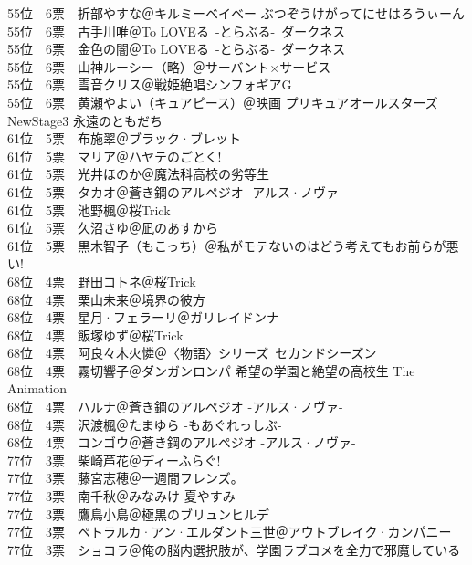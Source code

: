 {    55位　6票　折部やすな＠キルミーベイベー ぶつぞうけがってにせはろうぃーん\\
    55位　6票　古手川唯＠To LOVEる~-とらぶる-~ダークネス\\
    55位　6票　金色の闇＠To LOVEる~-とらぶる-~ダークネス\\
    55位　6票　山神ルーシー（略）＠サーバント×サービス\\
    55位　6票　雪音クリス＠戦姫絶唱シンフォギアG\\
    55位　6票　黄瀬やよい（キュアピース）＠映画 プリキュアオールスターズNewStage3 永遠のともだち\\
    61位　5票　布施翠＠ブラック·ブレット\\
    61位　5票　マリア＠ハヤテのごとく!\\
    61位　5票　光井ほのか＠魔法科高校の劣等生\\
    61位　5票　タカオ＠蒼き鋼のアルペジオ -アルス·ノヴァ-\\
    61位　5票　池野楓＠桜Trick\\
    61位　5票　久沼さゆ＠凪のあすから\\
    61位　5票　黒木智子（もこっち）＠私がモテないのはどう考えてもお前らが悪い!\\
    68位　4票　野田コトネ＠桜Trick\\
    68位　4票　栗山未来＠境界の彼方\\
    68位　4票　星月·フェラーリ＠ガリレイドンナ\\
    68位　4票　飯塚ゆず＠桜Trick\\
    68位　4票　阿良々木火憐＠〈物語〉シリーズ~セカンドシーズン\\
    68位　4票　霧切響子＠ダンガンロンパ 希望の学園と絶望の高校生 The Animation\\
    68位　4票　ハルナ＠蒼き鋼のアルペジオ -アルス·ノヴァ-\\
    68位　4票　沢渡楓＠たまゆら -もあぐれっしぶ-\\
    68位　4票　コンゴウ＠蒼き鋼のアルペジオ -アルス·ノヴァ-\\
    77位　3票　柴崎芦花＠ディーふらぐ!\\
    77位　3票　藤宮志穂＠一週間フレンズ。\\
    77位　3票　南千秋＠みなみけ 夏やすみ\\
    77位　3票　鷹鳥小鳥＠極黒のブリュンヒルデ\\
    77位　3票　ペトラルカ·アン·エルダント三世＠アウトブレイク·カンパニー\\
    77位　3票　ショコラ＠俺の脳内選択肢が、学園ラブコメを全力で邪魔している\\
}
